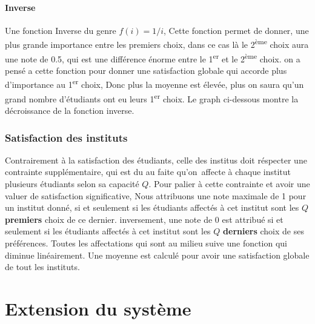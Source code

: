 \documentclass[12pt,titlepage]{article}
\begin{document}
\begin{figure}
  
\end{figure}

\paragraph{Inverse} Une fonction Inverse du genre $f(i) = 1/i$, Cette fonction permet de donner, une plus grande importance entre les premiers choix, dans ce cas là le 2\textsuperscript{ème} choix aura une note de 0.5, qui est une différence énorme entre le 1\textsuperscript{er} et le 2\textsuperscript{ème} choix. on a pensé a cette fonction pour donner une satisfaction globale qui accorde plus d'importance au 1\textsuperscript{er} choix, Donc plus la moyenne est élevée, plus on saura qu'un grand nombre d'étudiants ont eu leurs 1\textsuperscript{er} choix. Le graph ci-dessous montre la décroissance de la fonction inverse. 

\begin{figure}
  
\end{figure}



\subsubsection*{Satisfaction des instituts}
Contrairement à la satisfaction des étudiants, celle des institus doit réspecter une contrainte supplémentaire, qui est du au faite qu'on affecte à chaque institut plusieurs étudiants selon sa capacité $Q$. Pour palier à cette contrainte et avoir une valuer de satisfaction significative, Nous attribuons une note maximale de 1 pour un institut donné, si et seulement si les étudiants affectés à cet institut sont les $Q$ \textbf{premiers} choix de ce dernier. inversement, une note de 0 est attribué si et seulement si les étudiants affectés à cet institut sont les $Q$ \textbf{derniers} choix de ses préférences. Toutes les affectations qui sont au milieu suive une fonction qui diminue linéairement. Une moyenne est calculé pour avoir une satisfaction globale de tout les instituts.


\begin{figure}
  
\end{figure}


\section{Extension du système}
\end{document}
